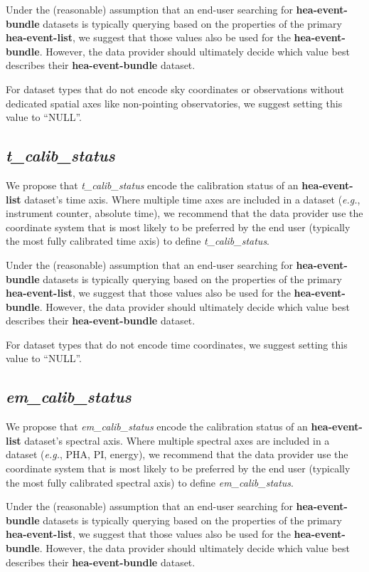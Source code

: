 \documentclass[11pt,a4paper]{ivoa}
\begin{document}
Under the (reasonable) assumption that an end-user searching for {\bf hea-event-bundle} datasets is typically querying based on the properties of the primary {\bf hea-event-list}, we suggest that those values also be used for the {\bf hea-event-bundle}.  However, the data provider should ultimately decide which value best describes their {\bf hea-event-bundle} dataset.

For dataset types that do not encode sky coordinates or observations without dedicated spatial axes like non-pointing observatories, we suggest setting this value to ``NULL''.

\subsection{{\em t\_calib\_status}}

We propose that {\em t\_calib\_status\/} encode the calibration status of an {\bf hea-event-list} dataset's time axis.  Where multiple time axes are included in a dataset ({\em e.g.\/}, instrument counter, absolute time), we recommend that the data provider use the coordinate system that is most likely to be preferred by the end user (typically the most fully calibrated time axis) to define {\em t\_calib\_sta\-tus\/}.

Under the (reasonable) assumption that an end-user searching for {\bf hea-event-bundle} datasets is typically querying based on the properties of the primary {\bf hea-event-list}, we suggest that those values also be used for the {\bf hea-event-bundle}.  However, the data provider should ultimately decide which value best describes their {\bf hea-event-bundle} dataset.

For dataset types that do not encode time coordinates, we suggest setting this value to ``NULL''.

\subsection{{\em em\_calib\_status}}

We propose that {\em em\_calib\_status\/} encode the calibration status of an {\bf hea-event-list} dataset's spectral axis.  Where multiple spectral axes are included in a dataset ({\em e.g.\/}, PHA, PI, energy), we recommend that the data provider use the coordinate system that is most likely to be preferred by the end user (typically the most fully calibrated spectral axis) to define {\em em\_calib\_status\/}.

Under the (reasonable) assumption that an end-user searching for {\bf hea-event-bundle} datasets is typically querying based on the properties of the primary {\bf hea-event-list}, we suggest that those values also be used for the {\bf hea-event-bundle}.  However, the data provider should ultimately decide which value best describes their {\bf hea-event-bundle} dataset.
\end{document}
